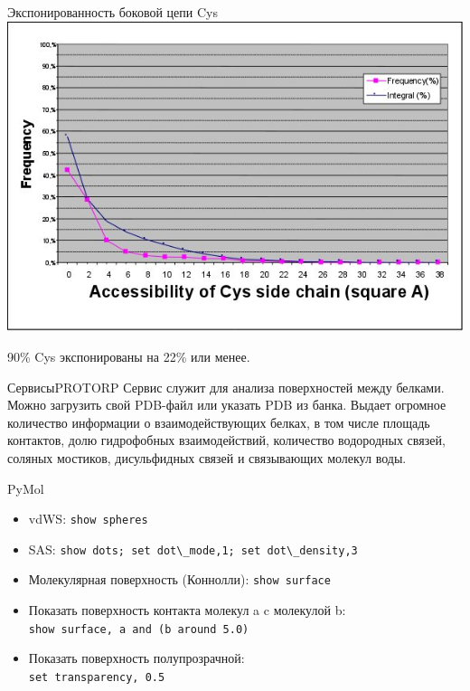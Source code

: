 \documentclass{beamer}
\begin{document}
    \begin{frame}{Экспонированность боковой цепи Cys}
        \includegraphics[height=0.8\textheight]{exp-cys.jpg}

        90\% Cys экспонированы на 22\% или менее.
    \end{frame}

    \begin{frame}{Сервисы}{PROTORP}
    Сервис служит для анализа поверхностей между белками.
    Можно загрузить свой PDB-файл или указать PDB из банка.
    Выдает огромное количество информации о взаимодействующих белках,
    в том числе площадь контактов, долю гидрофобных взаимодействий,
    количество водородных связей, соляных мостиков, дисульфидных связей
    и связывающих молекул воды.
    \end{frame}

    \begin{frame}{PyMol}
        \begin{itemize}
        \item vdWS: \verb"show spheres"
        \item SAS: \verb"show dots; set dot\_mode,1; set dot\_density,3"
        \item Молекулярная поверхность (Коннолли): \verb"show surface"
        \item Показать поверхность контакта молекул a c молекулой b:\\
            \verb"show surface, a and (b around 5.0)"
        \item Показать поверхность полупрозрачной: \\
            \verb"set transparency, 0.5"
        \end{itemize}
    \end{frame}
\end{document}
